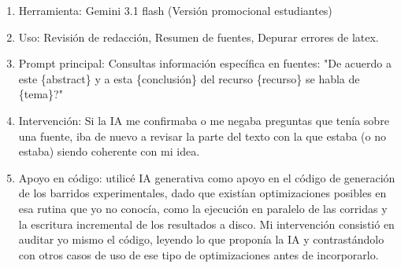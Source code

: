 \documentclass[letter, 10pt]{article}
\begin{document}
\begin{enumerate}
    \item Herramienta: Gemini 3.1 flash (Versión promocional estudiantes)
    \item Uso: Revisión de redacción, Resumen de fuentes, Depurar errores de latex.
    \item Prompt principal: Consultas información específica en fuentes: "De acuerdo a este \{abstract\} y a esta \{conclusión\} del recurso \{recurso\} se habla de \{tema\}?"
    \item Intervención: Si la IA me confirmaba o me negaba preguntas que tenía sobre una fuente, iba de nuevo a revisar la parte del texto con la que estaba (o no estaba) siendo coherente con mi idea.
    \item Apoyo en código: utilicé IA generativa como apoyo en el código de generación de los barridos experimentales, dado que existían optimizaciones posibles en esa rutina que yo no conocía, como la ejecución en paralelo de las corridas y la escritura incremental de los resultados a disco. Mi intervención consistió en auditar yo mismo el código, leyendo lo que proponía la IA y contrastándolo con otros casos de uso de ese tipo de optimizaciones antes de incorporarlo.
\end{enumerate}



\end{document}

